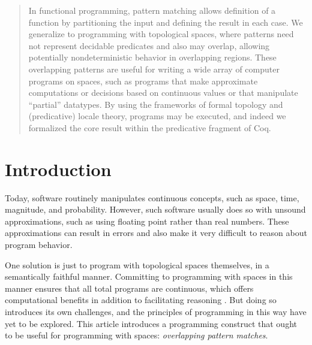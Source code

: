 \documentclass[conference]{IEEEtran}
\begin{document}
\begin{abstract}
In functional programming, pattern matching allows definition of a function by partitioning the input and defining the result in each case. We generalize to programming with topological spaces, where patterns need not represent decidable predicates and also may overlap, allowing potentially nondeterministic behavior in overlapping regions. These overlapping patterns are useful for writing a wide array of computer programs on spaces, such as programs that make approximate computations or decisions based on continuous values or that manipulate ``partial'' datatypes. By using the frameworks of formal topology and (predicative) locale theory, programs may be executed, and indeed we formalized the core result within the predicative fragment of Coq.
\end{abstract}





%
\IEEEpeerreviewmaketitle


\section{Introduction}

Today, software routinely manipulates continuous concepts, such as space, time, magnitude, and probability. However, such software usually does so with unsound approximations, such as using floating point rather than real numbers. These approximations can result in errors and also make it very difficult to reason about program behavior.

One solution is just to program with topological spaces themselves, in a semantically faithful manner. Committing to programming with spaces in this manner ensures that all total programs are continuous, which offers computational benefits in addition to facilitating reasoning \cite{lamcra, escardoinfinite, escardo2004, simpson1998lazy}. But doing so introduces its own challenges, and the principles of programming in this way have yet to be explored. This article introduces a programming construct that ought to be useful for programming with spaces: \emph{overlapping pattern matches}.
\end{document}
